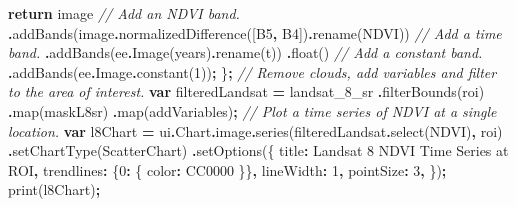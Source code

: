 \documentclass[
]{article}
\newenvironment{Shaded}{\begin{snugshade}}{\end{snugshade}}
\newcommand{\AttributeTok}[1]{\textcolor[rgb]{0.77,0.63,0.00}{#1}}
\newcommand{\CommentTok}[1]{\textcolor[rgb]{0.56,0.35,0.01}{\textit{#1}}}
\newcommand{\ControlFlowTok}[1]{\textcolor[rgb]{0.13,0.29,0.53}{\textbf{#1}}}
\newcommand{\DataTypeTok}[1]{\textcolor[rgb]{0.13,0.29,0.53}{#1}}
\newcommand{\DecValTok}[1]{\textcolor[rgb]{0.00,0.00,0.81}{#1}}
\newcommand{\FunctionTok}[1]{\textcolor[rgb]{0.00,0.00,0.00}{#1}}
\newcommand{\KeywordTok}[1]{\textcolor[rgb]{0.13,0.29,0.53}{\textbf{#1}}}
\newcommand{\NormalTok}[1]{#1}
\newcommand{\OperatorTok}[1]{\textcolor[rgb]{0.81,0.36,0.00}{\textbf{#1}}}
\newcommand{\StringTok}[1]{\textcolor[rgb]{0.31,0.60,0.02}{#1}}
\begin{document}
\begin{Shaded}
\begin{Highlighting}[]
  \ControlFlowTok{return}\NormalTok{ image}
  \CommentTok{// Add an NDVI band.}
  \OperatorTok{.}\FunctionTok{addBands}\NormalTok{(image}\OperatorTok{.}\FunctionTok{normalizedDifference}\NormalTok{([}\StringTok{\textquotesingle{}B5\textquotesingle{}}\OperatorTok{,} \StringTok{\textquotesingle{}B4\textquotesingle{}}\NormalTok{])}\OperatorTok{.}\FunctionTok{rename}\NormalTok{(}\StringTok{\textquotesingle{}NDVI\textquotesingle{}}\NormalTok{))}
  \CommentTok{// Add a time band.}
  \OperatorTok{.}\FunctionTok{addBands}\NormalTok{(ee}\OperatorTok{.}\FunctionTok{Image}\NormalTok{(years)}\OperatorTok{.}\FunctionTok{rename}\NormalTok{(}\StringTok{\textquotesingle{}t\textquotesingle{}}\NormalTok{))}
  \OperatorTok{.}\FunctionTok{float}\NormalTok{()}
  \CommentTok{// Add a constant band.}
  \OperatorTok{.}\FunctionTok{addBands}\NormalTok{(ee}\OperatorTok{.}\AttributeTok{Image}\OperatorTok{.}\FunctionTok{constant}\NormalTok{(}\DecValTok{1}\NormalTok{))}\OperatorTok{;}
\NormalTok{\}}\OperatorTok{;}
\CommentTok{// Remove clouds, add variables and filter to the area of interest.}
\KeywordTok{var}\NormalTok{ filteredLandsat }\OperatorTok{=}\NormalTok{ landsat\_8\_sr}
\OperatorTok{.}\FunctionTok{filterBounds}\NormalTok{(roi)}
\OperatorTok{.}\FunctionTok{map}\NormalTok{(maskL8sr)}
\OperatorTok{.}\FunctionTok{map}\NormalTok{(addVariables)}\OperatorTok{;}
\CommentTok{// Plot a time series of NDVI at a single location.}
\KeywordTok{var}\NormalTok{ l8Chart }\OperatorTok{=}\NormalTok{ ui}\OperatorTok{.}\AttributeTok{Chart}\OperatorTok{.}\AttributeTok{image}\OperatorTok{.}\FunctionTok{series}\NormalTok{(filteredLandsat}\OperatorTok{.}\FunctionTok{select}\NormalTok{(}\StringTok{\textquotesingle{}NDVI\textquotesingle{}}\NormalTok{)}\OperatorTok{,}\NormalTok{ roi)}
  \OperatorTok{.}\FunctionTok{setChartType}\NormalTok{(}\StringTok{\textquotesingle{}ScatterChart\textquotesingle{}}\NormalTok{)}
  \OperatorTok{.}\FunctionTok{setOptions}\NormalTok{(\{}
   \DataTypeTok{title}\OperatorTok{:} \StringTok{\textquotesingle{}Landsat 8 NDVI Time Series at ROI\textquotesingle{}}\OperatorTok{,}
   \DataTypeTok{trendlines}\OperatorTok{:}\NormalTok{ \{}\DecValTok{0}\OperatorTok{:}\NormalTok{ \{}
                \DataTypeTok{color}\OperatorTok{:} \StringTok{\textquotesingle{}CC0000\textquotesingle{}}
\NormalTok{   \}\}}\OperatorTok{,}
   \DataTypeTok{lineWidth}\OperatorTok{:} \DecValTok{1}\OperatorTok{,}
   \DataTypeTok{pointSize}\OperatorTok{:} \DecValTok{3}\OperatorTok{,}
\NormalTok{  \})}\OperatorTok{;}
\FunctionTok{print}\NormalTok{(l8Chart)}\OperatorTok{;}
\end{Highlighting}
\end{Shaded}
\end{document}
